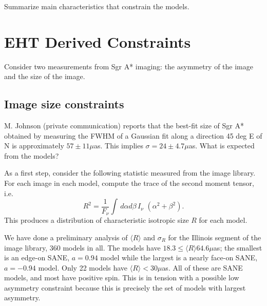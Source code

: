 \documentclass[twocolumn,tighten,dvipsnames]{aastex63}
\newcommand\<{{\langle}}
\renewcommand\>{{\rangle}} %
\begin{document}

Summarize main characteristics that constrain the models.

\section{EHT Derived Constraints}
\label{sec:ehtconst}

Consider two measurements from Sgr A* imaging: the asymmetry of the image and the size of the image.

\subsection{Image size constraints}
\label{sec:sizeconst}

M. Johnson (private communication) reports that the best-fit size of Sgr A* obtained by measuring the FWHM of a Gaussian fit along a direction 45 deg E of N is approximately $57 \pm 11 \mu$as.  This implies $\sigma = 24 \pm 4.7 \mu$as.  What is expected from the models?

As a first step, consider the following statistic measured from the image library.  For each image in each model, compute the trace of the second moment tensor, i.e.
\begin{equation}
    R^2 = \frac{1}{F_\nu} \int \, d\alpha d\beta \, I_\nu \,\, (\alpha^2 + \beta^2).
\end{equation}
This produces a distribution of characteristic isotropic size $R$ for each model.

We have done a preliminary analysis of $\langle R \rangle$ and $\sigma_R$ for the Illinois segment of the image library, 360 models in all.  The models have  $18.3 \le \langle R \rangle 64.6 \mu$as; the smallest is an edge-on SANE, $a = 0.94$ model while the largest is a nearly face-on SANE, $a = -0.94$ model.  Only 22 models have $\langle R \rangle < 30\mu$as.  All of these are SANE models, and most have positive spin.  This is in tension with a possible low  asymmetry constraint because this is precisely the set of models with largest asymmetry.
\end{document}
